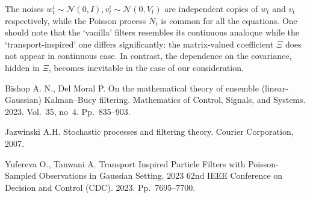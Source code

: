 \documentclass[12pt]{llncs}
\begin{document}
The noises
$w^i_t\sim \mathcal{N}(0,I), v^i_t\sim \mathcal{N}(0,V_t)$ are independent copies of $w_t$ and $v_t$ respectively, while the Poisson process $N_t$ is common for all the equations.
One should note that the `vanilla' filters resembles its continuous analoque while the `transport-inspired' one differs significantly: the matrix-valued coefficient $\Xi$ does not appear in continuous case. In contrast, the dependence on the covariance, hidden in  $\Xi$, becomes inevitable in the case of our consideration.


\begin{thebibliography}{9} %

 Bishop A. N., Del Moral P. On the mathematical theory of ensemble (linear-Gaussian) Kalman–Bucy filtering. Mathematics of Control, Signals, and Systems. 2023. Vol.~35, no~4. Pp.~835--903.

 Jazwinski A.H. Stochastic processes and filtering theory. Courier Corporation, 2007.

 Yufereva O., Tanwani A. Transport Inspired Particle Filters with Poisson-Sampled Observations in Gaussian Setting. 2023 62nd IEEE Conference on Decision and Control (CDC). 2023. Pp.~7695--7700.

\end{thebibliography}
\end{document}

